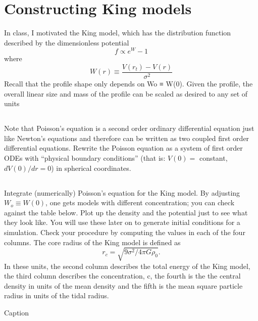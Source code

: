 \section{Constructing King models}
In class, I motivated the King model, which has the distribution function described by the dimensionless potential
\begin{equation}
    f\propto e^W -1
\end{equation}
where 
\begin{equation}
    W(r)\equiv\frac{V(r_t)-V(r)}{\sigma^2}
\end{equation}
Recall that the profile shape only depends on Wo ≡ W(0). Given the
profile, the overall linear size and mass of the profile can be scaled as
desired to any set of units
\subsection{}
Note that Poisson’s equation is a second order ordinary differential
equation just like Newton’s equations and therefore can be written as two coupled first order differential equations. Rewrite the
Poisson equation as a system of first order ODEs with “physical
boundary conditions” (that is: $V(0) = $ constant, $dV(0)/dr = 0$) in
spherical coordinates.

\subsection{}
Integrate (numerically) Poisson’s equation for the King model. By
adjusting $W_o\equiv W(0)$, one gets models with different concentration; you can check against the table below. Plot up the density and the potential just to see what they look like. You will
use these later on to generate initial conditions for a simulation.
Check your procedure by computing the values in each of the
four columns. The core radius of the King model is defined as
\begin{equation}
    r_c=\sqrt{9\sigma^2/4\pi G \rho_0}.
\end{equation}
In these units, the second column describes
the total energy of the King model, the third column describes the
concentration, c, the fourth is the the central density in units of
the mean density and the fifth is the mean square particle radius in
units of the tidal radius.

\begin{table}[]
    \centering
    
    \caption{Caption}
    \label{tab:my_label}
\end{table}




